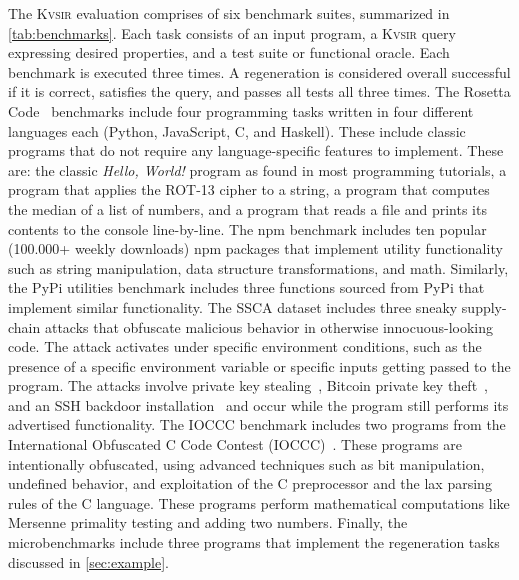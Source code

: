 \documentclass[nonacm,sigplan,review]{acmart}
\newcommand{\sys}{{\scshape Kv{\textalpha}sir}\xspace}
\begin{document}
The \sys evaluation comprises of six benchmark suites, summarized in \cref{tab:benchmarks}.
Each task consists of an input program, a \sys query expressing desired
properties, and a test suite or functional oracle.
Each benchmark is executed three times. A regeneration is considered overall successful 
if it is correct, satisfies the query, and passes all tests all three times.
The Rosetta Code~\cite{rosettacode} benchmarks include four programming tasks written in four different
languages each (Python, JavaScript, C, and Haskell). 
These include classic programs that do not require any language-specific features to implement.
These are: the classic \emph{Hello, World!} program as found in most programming tutorials,
a program that applies the ROT-13 cipher to a string,
a program that computes the median of a list of numbers,
and a program that reads a file and prints its contents to the console line-by-line.
The npm benchmark includes ten popular (100.000+ weekly downloads) npm packages that implement utility
functionality such as string manipulation, data structure transformations, and math.
Similarly, the PyPi utilities benchmark includes three functions sourced from PyPi that implement similar functionality.
The SSCA dataset includes three sneaky supply-chain attacks that obfuscate malicious behavior in otherwise innocuous-looking code.
The attack activates under specific environment conditions, such as the presence of a specific environment variable or specific inputs
getting passed to the program. The attacks involve private key stealing~\cite{ohm2020backstabber}, Bitcoin private key theft~\cite{ev:eurosec:2022}, and an SSH backdoor installation~\cite{copeland2019frightening}
and occur while the program still performs its advertised functionality.
The IOCCC benchmark includes two programs from the International Obfuscated C Code Contest (IOCCC)~\cite{ioccc}.
These programs are intentionally obfuscated, using advanced techniques such as bit manipulation, undefined behavior,
and exploitation of the C preprocessor and the lax parsing rules of the C language.
These programs perform mathematical computations like Mersenne primality testing and adding two numbers.
Finally, the microbenchmarks include three programs that implement the regeneration tasks discussed in \cref{sec:example}.
\end{document}
